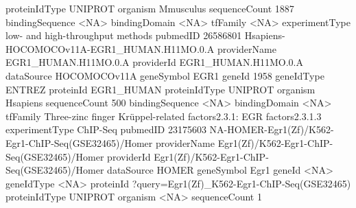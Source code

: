 \documentclass{article}
\renewenvironment{Schunk}{\vspace{\topsep}}{\vspace{\topsep}}
\begin{document}
\begin{Schunk}
\begin{Soutput}
proteinIdType   UNIPROT                                 
organism        Mmusculus                               
sequenceCount   1887                                    
bindingSequence <NA>                                    
bindingDomain   <NA>                                    
tfFamily        <NA>                                    
experimentType  low- and high-throughput methods        
pubmedID        26586801                                
                Hsapiens-HOCOMOCOv11A-EGR1_HUMAN.H11MO.0.A                            
providerName    EGR1_HUMAN.H11MO.0.A                                                  
providerId      EGR1_HUMAN.H11MO.0.A                                                  
dataSource      HOCOMOCOv11A                                                          
geneSymbol      EGR1                                                                  
geneId          1958                                                                  
geneIdType      ENTREZ                                                                
proteinId       EGR1_HUMAN                                                            
proteinIdType   UNIPROT                                                               
organism        Hsapiens                                                              
sequenceCount   500                                                                   
bindingSequence <NA>                                                                  
bindingDomain   <NA>                                                                  
tfFamily        Three-zinc finger Krüppel-related factors{2.3.1}: EGR factors{2.3.1.3}
experimentType  ChIP-Seq                                                              
pubmedID        23175603                                                              
                NA-HOMER-Egr1(Zf)/K562-Egr1-ChIP-Seq(GSE32465)/Homer
providerName    Egr1(Zf)/K562-Egr1-ChIP-Seq(GSE32465)/Homer         
providerId      Egr1(Zf)/K562-Egr1-ChIP-Seq(GSE32465)/Homer         
dataSource      HOMER                                               
geneSymbol      Egr1                                                
geneId          <NA>                                                
geneIdType      <NA>                                                
proteinId       ?query=Egr1(Zf)_K562-Egr1-ChIP-Seq(GSE32465)        
proteinIdType   UNIPROT                                             
organism        <NA>                                                
sequenceCount   1                                                   

\end{Soutput}
\end{Schunk}
\end{document}
